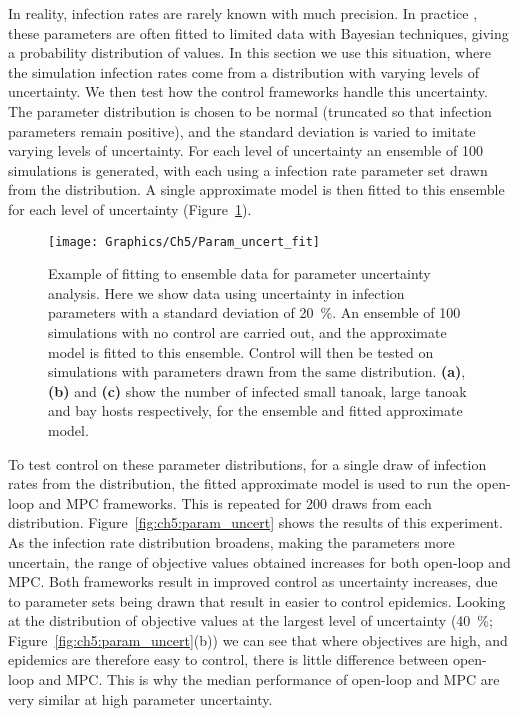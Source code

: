 
In reality, infection rates are rarely known with much precision. In practice \citationneeded, these parameters are often fitted to limited data with Bayesian techniques, giving a probability distribution of values. In this section we use this situation, where the simulation infection rates come from a distribution with varying levels of uncertainty. We then test how the control frameworks handle this uncertainty. The parameter distribution is chosen to be normal (truncated so that infection parameters remain positive), and the standard deviation is varied to imitate varying levels of uncertainty. For each level of uncertainty an ensemble of 100 simulations is generated, with each using a infection rate parameter set drawn from the distribution. A single approximate model is then fitted to this ensemble for each level of uncertainty (Figure~\ref{fig:ch5:param_uncert_fit}). 

\begin{figure}
    \begin{center}
        \texttt{[image: Graphics/Ch5/Param\_uncert\_fit]}
        \caption[Ensemble fitting under parameter uncertainty]{Example of fitting to ensemble data for parameter uncertainty analysis. Here we show data using uncertainty in infection parameters with a standard deviation of \SI{20}{\percent}. An ensemble of 100 simulations with no control are carried out, and the approximate model is fitted to this ensemble. Control will then be tested on simulations with parameters drawn from the same distribution. \textbf{(a)}, \textbf{(b)} and \textbf{(c)} show the number of infected small tanoak, large tanoak and bay hosts respectively, for the ensemble and fitted approximate model.\label{fig:ch5:param_uncert_fit}}
    \end{center}
\end{figure}

To test control on these parameter distributions, for a single draw of infection rates from the distribution, the fitted approximate model is used to run the open-loop and MPC frameworks. This is repeated for 200 draws from each distribution. Figure~\ref{fig:ch5:param_uncert} shows the results of this experiment. As the infection rate distribution broadens, making the parameters more uncertain, the range of objective values obtained increases for both open-loop and MPC\@. Both frameworks result in improved control as uncertainty increases, due to parameter sets being drawn that result in easier to control epidemics. Looking at the distribution of objective values at the largest level of uncertainty (\SI{40}{\percent}; Figure~\ref{fig:ch5:param_uncert}(b)) we can see that where objectives are high, and epidemics are therefore easy to control, there is little difference between open-loop and MPC\@.  This is why the median performance of open-loop and MPC are very similar at high parameter uncertainty.

